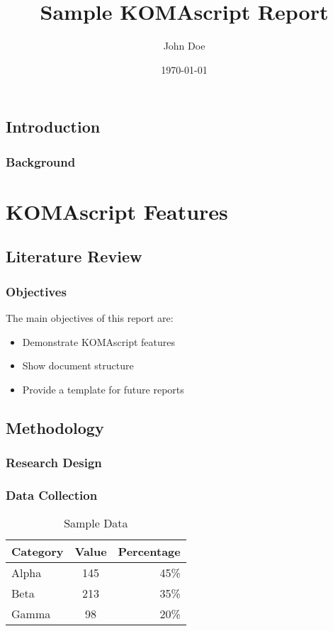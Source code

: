 \documentclass{scrreprt}
\title{Sample KOMAscript Report}
\author{John Doe}
\date{\today}
\begin{document}
\maketitle

\tableofcontents
\clearpage

\chapter{Introduction}
\blindtext[2]

\section{Background}
\blindtext

\part{KOMAscript Features}
\chapter{Literature Review}
\section{Objectives}
The main objectives of this report are:
\begin{itemize}
  \item Demonstrate KOMAscript features
  \item Show document structure
  \item Provide a template for future reports
\end{itemize}

\chapter{Methodology}
\blindtext[2]

\section{Research Design}
\blindtext

\section{Data Collection}
\begin{table}[h]
  \centering
  \caption{Sample Data}
  \begin{tabular}{lcr}
    \toprule
    Category & Value & Percentage \\
    \midrule
    Alpha & 145 & 45\% \\
    Beta & 213 & 35\% \\
    Gamma & 98 & 20\% \\
    \bottomrule
  \end{tabular}
\end{table}
\end{document}
